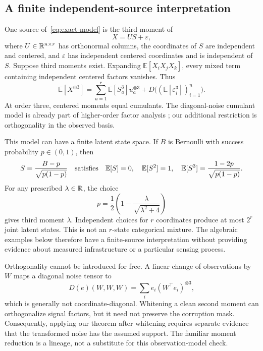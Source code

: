 \subsection{A finite independent-source interpretation}
One source of~\eqref{eq:exact-model} is the third moment of
\begin{equation}\label{eq:latent}
 X=US+\varepsilon,
\end{equation}
where $U\in\mathbb R^{n\times r}$ has orthonormal columns, the coordinates of $S$ are independent and centered, and $\varepsilon$ has independent centered coordinates and is independent of $S$. Suppose third moments exist. Expanding $\mathbb E[X_iX_jX_k]$, every mixed term containing independent centered factors vanishes. Thus
\begin{equation}\label{eq:moment}
 \mathbb E[X^{\otimes3}]
 =\sum_{a=1}^r \mathbb E[S_a^3]u_a^{\otimes3}
   +D\big((\mathbb E[\varepsilon_i^3])_{i=1}^n\big).
\end{equation}
At order three, centered moments equal cumulants. The diagonal-noise cumulant model is already part of higher-order factor analysis \citep{ardiyansyah2023}; our additional restriction is orthogonality in the observed basis.

This model can have a finite latent state space. If $B$ is Bernoulli with success probability $p\in(0,1)$, then
\begin{equation}\label{eq:bernoulli}
 S=\frac{B-p}{\sqrt{p(1-p)}}
 \quad\hbox{satisfies}\quad
 \mathbb E[S]=0,\quad \mathbb E[S^2]=1,\quad
 \mathbb E[S^3]=\frac{1-2p}{\sqrt{p(1-p)}}.
\end{equation}
For any prescribed $\lambda\in\mathbb R$, the choice
\begin{equation}\label{eq:bernoulli-p}
 p=\frac{1}{2}\left(1-\frac{\lambda}{\sqrt{\lambda^2+4}}\right)
\end{equation}
gives third moment $\lambda$. Independent choices for $r$ coordinates produce at most $2^r$ joint latent states. This is not an $r$-state categorical mixture. The algebraic examples below therefore have a finite-source interpretation without providing evidence about measured infrastructure or a particular sensing process.

Orthogonality cannot be introduced for free. A linear change of observations by $W$ maps a diagonal noise tensor to
\begin{equation}\label{eq:whitening-boundary}
 D(e)(W,W,W)=\sum_i e_i(W^\top e_i)^{\otimes3},
\end{equation}
which is generally not coordinate-diagonal. Whitening a clean second moment can orthogonalize signal factors, but it need not preserve the corruption mask. Consequently, applying our theorem after whitening requires separate evidence that the transformed noise has the assumed support. The familiar moment reduction is a lineage, not a substitute for this observation-model check.

